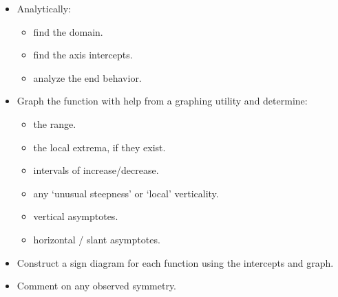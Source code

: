 \documentclass{ximera}
\begin{document}
\begin{itemize}

\item Analytically:

\begin{multicols}{3}

\begin{itemize}

\item find the domain.

\item find the axis intercepts.

\item analyze the end behavior.

\end{itemize}

\end{multicols}

\item Graph the function with help from a graphing utility and determine:

\begin{multicols}{2}

\begin{itemize}

\item  the range.

\item the local extrema, if they exist.

\end{itemize}

\end{multicols}

\begin{multicols}{2}

\begin{itemize}

\item intervals of increase/decrease.

\item any `unusual steepness' or `local' verticality.

\end{itemize}

\end{multicols}

\begin{multicols}{2}

\begin{itemize}

\item  vertical asymptotes.

\item  horizontal / slant asymptotes.

\end{itemize}

\end{multicols}

\item Construct a sign diagram for each function using the intercepts and graph.

\item  Comment on any observed symmetry.


\end{itemize}
\end{document}
